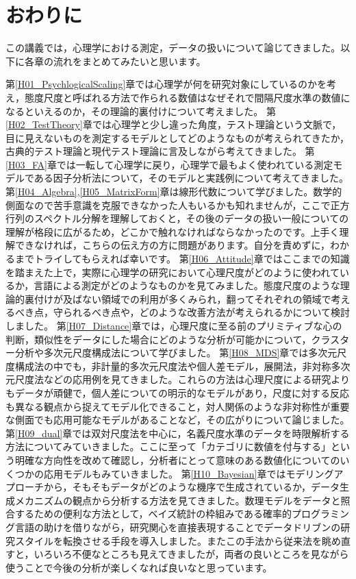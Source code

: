 \documentclass{ltjsbook}
\begin{document}
\chapter{おわりに}
\label{H11_Epilogue}
この講義では，心理学における測定，データの扱いについて論じてきました。以下に各章の流れをまとめてみたいと思います。

第\ref{H01_PsychlogicalScaling}章では心理学が何を研究対象にしているのかを考え，態度尺度と呼ばれる方法で作られる数値はなぜそれで間隔尺度水準の数値になるといえるのか，その理論的裏付けについて考えました。
第\ref{H02_TestTheory}章では心理学と少し違った角度，テスト理論という文脈で，目に見えないものを測定するモデルとしてどのようなものが考えられてきたか，古典的テスト理論と現代テスト理論に言及しながら考えてきました。
第\ref{H03_FA}章では一転して心理学に戻り，心理学で最もよく使われている測定モデルである因子分析法について，そのモデルと実践例について考えてきました。
第\ref{H04_Algebra},\ref{H05_MatrixForm}章は線形代数について学びました。数学的側面なので苦手意識を克服できなかった人もいるかも知れませんが，ここで正方行列のスペクトル分解を理解しておくと，その後のデータの扱い一般についての理解が格段に広がるため，どこかで触れなければならなかったのです。上手く理解できなければ，こちらの伝え方の方に問題があります。自分を責めずに，わかるまでトライしてもらえれば幸いです。
第\ref{H06_Attitude}章ではここまでの知識を踏まえた上で，実際に心理学の研究において心理尺度がどのように使われているか，言語による測定がどのようなものかを見てみました。態度尺度のような理論的裏付けが及ばない領域での利用が多くみられ，翻ってそれぞれの領域で考えるべき点，守られるべき点や，どのような改善方法が考えられるかについて検討しました。
第\ref{H07_Distance}章では，心理尺度に至る前のプリミティブな心の判断，類似性をデータにした場合にどのような分析が可能かについて，クラスター分析や多次元尺度構成法について学びました。
第\ref{H08_MDS}章では多次元尺度構成法の中でも，非計量的多次元尺度法や個人差モデル，展開法，非対称多次元尺度法などの応用例を見てきました。これらの方法は心理尺度による研究よりもデータが頑健で，個人差についての明示的なモデルがあり，尺度に対する反応も異なる観点から捉えてモデル化できること，対人関係のような非対称性が重要な側面でも応用可能なモデルがあることなど，その広がりについて論じました。
第\ref{H09_dual}章では双対尺度法を中心に，名義尺度水準のデータを時限解析する方法についてみていきました。ここに至って「カテゴリに数値を付与する」という明確な方向性を改めて確認し，分析者にとって意味のある数値化についてのいくつかの応用モデルもみていきました。
第\ref{H10_Bayesian}章ではモデリングアプローチから，そもそもデータがどのような機序で生成されているか，データ生成メカニズムの観点から分析する方法を見てきました。数理モデルをデータと照合するための便利な方法として，ベイズ統計の枠組みである確率的プログラミング言語の助けを借りながら，研究関心を直接表現することでデータドリブンの研究スタイルを転換させる手段を導入しました。またこの手法から従来法を眺め直すと，いろいろ不便なところも見えてきましたが，両者の良いところを見ながら使うことで今後の分析が楽しくなれば良いなと思っています。
\end{document}
